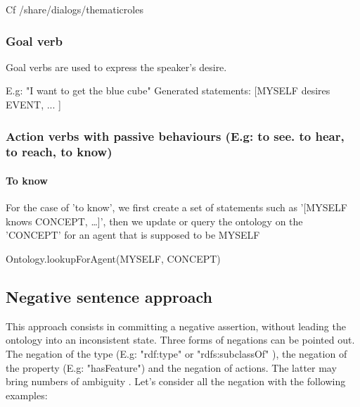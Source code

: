 \documentclass[twoside,a4paper,10pt]{report}
\begin{document}
Cf /share/dialogs/thematic{\textunderscore}roles


\subsubsection{Goal verb}

Goal verbs are used to express the speaker's desire. 


\small
\begin{verbatimtab}
  
  E.g: "I want to get the blue cube"
  Generated statements: 
      [MYSELF desires EVENT, 
      ...
      ]
\end{verbatimtab}
\normalsize

\subsubsection{Action verbs with passive behaviours (E.g: to see. to hear, to reach, to know)}

\small
\begin{verbatimtab}
\end{verbatimtab}
\normalsize

\paragraph{To know}

For the case of 'to know', we first create a set of statements such as '[MYSELF knows CONCEPT, \ldots{}]', then we update or query the ontology on the 'CONCEPT' for an agent that is supposed to be MYSELF


\small
\begin{verbatimtab}
      Ontology.lookupForAgent(MYSELF, CONCEPT)
             
\end{verbatimtab}
\normalsize

\subsection{Negative sentence approach}
\label{51e3775766a7025963abe3551cc8889c}%
This approach consists in committing a negative assertion, without leading the ontology into an inconsistent state. Three forms of negations can be pointed out.
The negation of the type (E.g: "rdf:type" or "rdfs:subclassOf" ), the negation of the property (E.g: "hasFeature") and the negation of actions. The latter may bring numbers of ambiguity .
Let's consider all the negation with the following examples:
\end{document}
